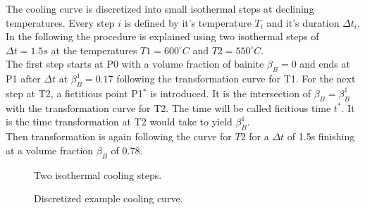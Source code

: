 The cooling curve is discretized into small isothermal steps at declining temperatures. Every step $i$ is defined by it's temperature $T_i$ and it's duration $\Delta t_i$. \\
In the following the procedure is explained using two isothermal steps of $\Delta t = 1.5s$ at the temperatures  $T1 = 600^\circ C$ and $T2 = 550^\circ C$. \\ 
The first step starts at P0 with a volume fraction of bainite 
$\beta_B = 0$ and ends at P1 after $\Delta t$ at $\beta_B^1 = 0.17$ following the transformation curve for T1.  
For the next step at T2, a fictitious point P1$^\ast$ is introduced. It is the intersection of $\beta_B = \beta_B^1$ with the transformation curve for T2. The time will be called ficitious time $t^\ast$. It is the time transformation at T2 would take to yield $\beta_B^1$.\\
Then transformation is again  following the curve for $T2$ for a $\Delta t$ of 1.5s finishing at a volume fraction $\beta_B$ of 0.78. \\


\begin{figure}[h]
\centering
{} %
\caption{Two isothermal cooling steps.}
\label{fig:ficTime}
\end{figure}

\begin{figure}[h]
\centering
{} 
\caption{Discretized example cooling curve.}
\label{fig:discTt}
\end{figure}

\begin{figure}[h]
\centering
{} %
\caption{}
\label{fig:}
\end{figure}




